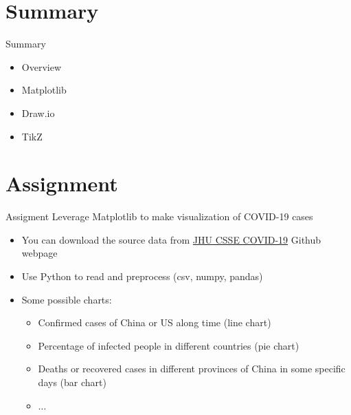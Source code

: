 \documentclass{../TexTemplate/myslide}
\begin{document}
\section{Summary}
\begin{frame}
\sectionpage
\end{frame}

\begin{frame}{Summary}
\begin{itemize}
	\item Overview
	\item Matplotlib
	\item Draw.io
	\item TikZ
\end{itemize}
\end{frame}

\section{Assignment}
\begin{frame}{Assigment}
Leverage Matplotlib to make visualization of COVID-19 cases
\begin{itemize}
	\item You can download the source data from \href{https://github.com/CSSEGISandData/COVID-19/tree/master/csse_covid_19_data}{JHU CSSE COVID-19} Github webpage
	\item Use Python to read and preprocess (csv, numpy, pandas)
	\item Some possible charts:
	\begin{itemize}
		\item Confirmed cases of China or US along time (line chart)
		\item Percentage of infected people in different countries (pie chart)
		\item Deaths or recovered cases in different provinces of China in some specific days (bar chart)
		\item $\ldots$
	\end{itemize}
\end{itemize}
\end{frame}
\end{document}
